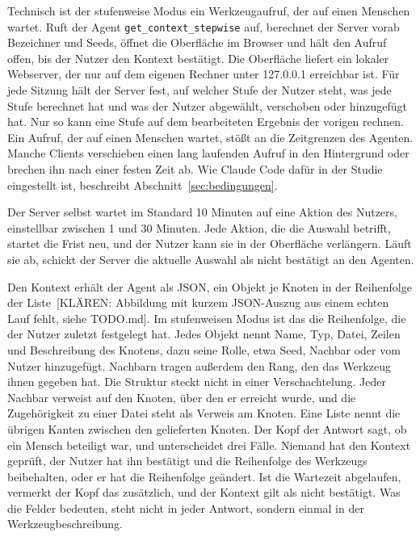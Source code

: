 Technisch ist der stufenweise Modus ein Werkzeugaufruf, der auf einen Menschen wartet. Ruft der Agent \texttt{get\_context\_stepwise} auf, berechnet der Server vorab Bezeichner und Seeds, öffnet die Oberfläche im Browser und hält den Aufruf offen, bis der Nutzer den Kontext bestätigt. Die Oberfläche liefert ein lokaler Webserver, der nur auf dem eigenen Rechner unter 127.0.0.1 erreichbar ist. Für jede Sitzung hält der Server fest, auf welcher Stufe der Nutzer steht, was jede Stufe berechnet hat und was der Nutzer abgewählt, verschoben oder hinzugefügt hat. Nur so kann eine Stufe auf dem bearbeiteten Ergebnis der vorigen rechnen. Ein Aufruf, der auf einen Menschen wartet, stößt an die Zeitgrenzen des Agenten. Manche Clients verschieben einen lang laufenden Aufruf in den Hintergrund oder brechen ihn nach einer festen Zeit ab. Wie Claude Code dafür in der Studie eingestellt ist, beschreibt Abschnitt~\ref{sec:bedingungen}.

Der Server selbst wartet im Standard 10 Minuten auf eine Aktion des Nutzers, einstellbar zwischen 1 und 30 Minuten. Jede Aktion, die die Auswahl betrifft, startet die Frist neu, und der Nutzer kann sie in der Oberfläche verlängern. Läuft sie ab, schickt der Server die aktuelle Auswahl als nicht bestätigt an den Agenten.

Den Kontext erhält der Agent als JSON, ein Objekt je Knoten in der Reihenfolge der Liste~[KLÄREN: Abbildung mit kurzem JSON-Auszug aus einem echten Lauf fehlt, siehe TODO.md]. Im stufenweisen Modus ist das die Reihenfolge, die der Nutzer zuletzt festgelegt hat. Jedes Objekt nennt Name, Typ, Datei, Zeilen und Beschreibung des Knotens, dazu seine Rolle, etwa Seed, Nachbar oder vom Nutzer hinzugefügt. Nachbarn tragen außerdem den Rang, den das Werkzeug ihnen gegeben hat. Die Struktur steckt nicht in einer Verschachtelung. Jeder Nachbar verweist auf den Knoten, über den er erreicht wurde, und die Zugehörigkeit zu einer Datei steht als Verweis am Knoten. Eine Liste nennt die übrigen Kanten zwischen den gelieferten Knoten. Der Kopf der Antwort sagt, ob ein Mensch beteiligt war, und unterscheidet drei Fälle. Niemand hat den Kontext geprüft, der Nutzer hat ihn bestätigt und die Reihenfolge des Werkzeugs beibehalten, oder er hat die Reihenfolge geändert. Ist die Wartezeit abgelaufen, vermerkt der Kopf das zusätzlich, und der Kontext gilt als nicht bestätigt. Was die Felder bedeuten, steht nicht in jeder Antwort, sondern einmal in der Werkzeugbeschreibung.

